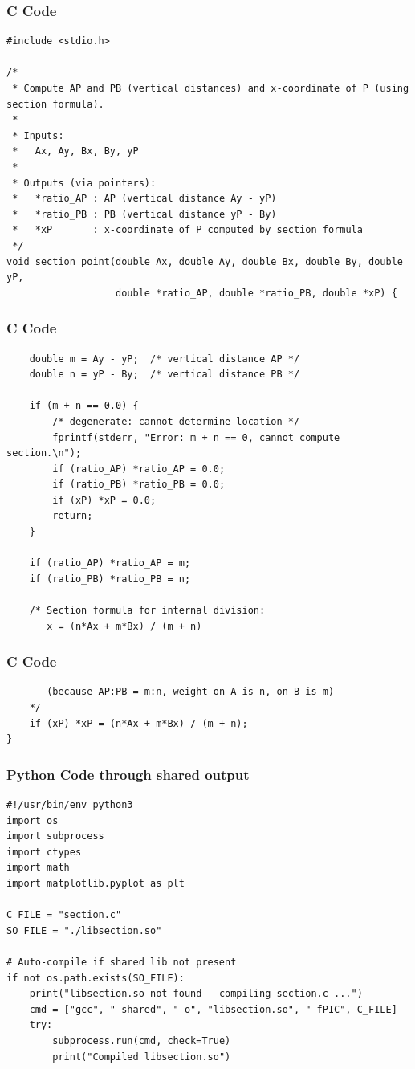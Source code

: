 \documentclass{beamer}
\begin{document}
\begin{frame}[fragile]
\frametitle{C Code }
\begin{lstlisting}
#include <stdio.h>

/*
 * Compute AP and PB (vertical distances) and x-coordinate of P (using section formula).
 *
 * Inputs:
 *   Ax, Ay, Bx, By, yP
 *
 * Outputs (via pointers):
 *   *ratio_AP : AP (vertical distance Ay - yP)
 *   *ratio_PB : PB (vertical distance yP - By)
 *   *xP       : x-coordinate of P computed by section formula
 */
void section_point(double Ax, double Ay, double Bx, double By, double yP,
                   double *ratio_AP, double *ratio_PB, double *xP) {
\end{lstlisting}
\end{frame}

\begin{frame}[fragile]
\frametitle{C Code }
\begin{lstlisting}
    double m = Ay - yP;  /* vertical distance AP */
    double n = yP - By;  /* vertical distance PB */

    if (m + n == 0.0) {
        /* degenerate: cannot determine location */
        fprintf(stderr, "Error: m + n == 0, cannot compute section.\n");
        if (ratio_AP) *ratio_AP = 0.0;
        if (ratio_PB) *ratio_PB = 0.0;
        if (xP) *xP = 0.0;
        return;
    }

    if (ratio_AP) *ratio_AP = m;
    if (ratio_PB) *ratio_PB = n;

    /* Section formula for internal division:
       x = (n*Ax + m*Bx) / (m + n)
\end{lstlisting}
\end{frame}
\begin{frame}[fragile]
\frametitle{C Code }
\begin{lstlisting}
       (because AP:PB = m:n, weight on A is n, on B is m)
    */
    if (xP) *xP = (n*Ax + m*Bx) / (m + n);
}
\end{lstlisting}
\end{frame}
\begin{frame}[fragile]
	\frametitle{Python Code through shared output}
	\begin{lstlisting}
#!/usr/bin/env python3
import os
import subprocess
import ctypes
import math
import matplotlib.pyplot as plt

C_FILE = "section.c"
SO_FILE = "./libsection.so"

# Auto-compile if shared lib not present
if not os.path.exists(SO_FILE):
    print("libsection.so not found — compiling section.c ...")
    cmd = ["gcc", "-shared", "-o", "libsection.so", "-fPIC", C_FILE]
    try:
        subprocess.run(cmd, check=True)
        print("Compiled libsection.so")
\end{lstlisting}
\end{frame}
\end{document}
